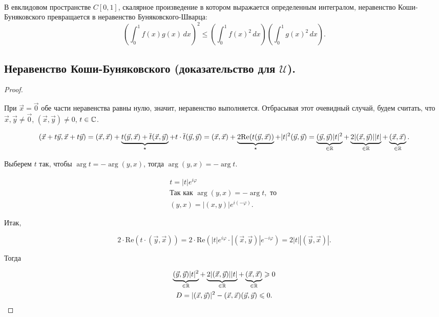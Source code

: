 \begin{corollary}~

    В евклидовом пространстве $C[0, 1]$, скалярное произведение в котором выражается определенным интегралом, неравенство Коши-Буняковского превращается в неравенство Буняковского-Шварца:
    $$\left( \int_0^1 f(x)g(x) \, dx \right)^2 \le \left( \int_0^1 f(x)^2 \, dx \right) \left( \int_0^1 g(x)^2 \, dx \right).$$
\end{corollary}


\newpage


\subsection{
    Неравенство Коши-Буняковского (доказательство для $\mathcal{U}$).
}


\begin{proof}~
    
    При $\vec{x} = \vec{0}$ обе части неравенства равны нулю, значит, неравенство выполняется. Отбрасывая этот очевидный случай, будем считать, что $\vec{x}, \vec{y} \ne \vec{0}$, $(\vec{x}, \vec{y}) \ne 0$, $t \in \mathbb{C}$.
    
    $$(\vec{x} + t\vec{y}, \vec{x} + t\vec{y}) = (\vec{x}, \vec{x}) + \underbrace{t(\vec{y}, \vec{x}) + \overline{t}(\vec{x}, \vec{y})}_{\star} + t \cdot \overline{t}(\vec{y}, \vec{y}) = (\vec{x}, \vec{x}) + \underbrace{2 \text{Re}(t(\vec{y}, \vec{x}))}_{\star} + |t|^2(\vec{y}, \vec{y}) = \underbrace{(\vec{y}, \vec{y})|t|^2}_{\in \mathbb{R}} + \underbrace{2|(\vec{x}, \vec{y})||t|}_{\in \mathbb{R}} + \underbrace{(\vec{x}, \vec{x})}_{\in \mathbb{R}}.$$

    Выберем $t$ так, чтобы $\arg{t} = -\arg{(y, x)}$, тогда $\arg{(y, x)} = -\arg{t}$.

    \begin{gather*}
        t = |t|e^{i\varphi} \\
        \text{Так как }\arg{(y, x)} = -\arg{t}, \text{ то } \\
        (y, x) = |(x, y)|e^{i(-\varphi)}.
    \end{gather*}

    Итак, 
    
    $$2 \cdot \text{Re} (t \cdot (\vec{y}, \vec{x})) = 2 \cdot \text{Re} (|t|e^{i\varphi} \cdot |(\vec{x}, \vec{y})|e^{-i\varphi}) = 2|t||(\vec{y}, \vec{x})|.$$

    Тогда

    \begin{gather*}
        \underbrace{(\vec{y}, \vec{y})|t|^2}_{\in \mathbb{R}} + \underbrace{2|(\vec{x}, \vec{y})||t|}_{\in \mathbb{R}} + \underbrace{(\vec{x}, \vec{x})}_{\in \mathbb{R}} \geqslant 0 \\
        D = |(\vec{x}, \vec{y})|^2 - (\vec{x}, \vec{x})(\vec{y}, \vec{y}) \leqslant 0.
    \end{gather*}


\end{proof}
